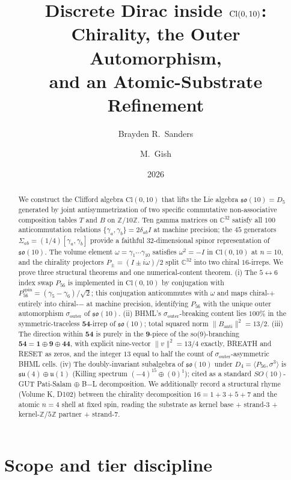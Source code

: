 \documentclass[11pt,reqno]{amsart}
\title[Discrete Dirac inside $\Cl(0, 10)$]
  {Discrete Dirac inside $\Cl(0, 10)$:\\
   Chirality, the Outer Automorphism,\\
   and an Atomic-Substrate Refinement}
\author{Brayden R.\ Sanders}
\author{M.\ Gish}
\date{2026}
\theoremstyle{definition}
\newcommand{\Z}{\mathbb{Z}}
\newcommand{\C}{\mathbb{C}}
\newcommand{\so}{\mathfrak{so}}
\newcommand{\su}{\mathfrak{su}}
\newcommand{\uone}{\mathfrak{u}}
\newcommand{\Cl}{\mathrm{Cl}}
\newcommand{\TSML}{T}
\newcommand{\BHML}{B}
\newcommand{\Psix}{P_{56}}
\newcommand{\Psixspin}{P_{56}^{\mathrm{spin}}}
\newcommand{\sout}{\sigma_{\mathrm{outer}}}
\begin{document}
\begin{abstract}
We construct the Clifford algebra $\Cl(0, 10)$ that lifts the
Lie algebra $\so(10) = D_5$ generated by joint antisymmetrization
of two specific commutative non-associative composition tables
$\TSML$ and $\BHML$ on $\Z/10\Z$. Ten gamma matrices on $\C^{32}$
satisfy all $100$ anticommutation relations $\{\gamma_a, \gamma_b\}
= 2\delta_{ab} I$ at machine precision; the $45$ generators
$\Sigma_{ab} = (1/4)[\gamma_a, \gamma_b]$ provide a faithful
$32$-dimensional spinor representation of $\so(10)$. The volume
element $\omega = \gamma_1 \cdots \gamma_{10}$ satisfies $\omega^2
= -I$ in $\Cl(0, 10)$ at $n=10$, and the chirality projectors
$P_\pm = (I \pm i\omega)/2$ split $\C^{32}$ into two chiral
$16$-irreps. We prove three structural theorems and one
numerical-content theorem. (i) The $5\!\leftrightarrow\!6$ index
swap $\Psix$ is implemented in $\Cl(0, 10)$ by conjugation with
$\Psixspin = (\gamma_5 - \gamma_6)/\sqrt{2}$; this conjugation
anticommutes with $\omega$ and maps chiral-$+$ entirely into
chiral-$-$ at machine precision, identifying $\Psix$ with the
unique outer automorphism $\sout$ of $\so(10)$. (ii) BHML's
$\sout$-breaking content lies $100\%$ in the symmetric-traceless
$\mathbf{54}$-irrep of $\so(10)$; total squared norm $\|B_{\mathrm{anti}}\|^2
= 13/2$. (iii) The direction within $\mathbf{54}$ is purely in the
$\mathbf{9}$-piece of the so(9)-branching $\mathbf{54} = \mathbf{1}
\oplus \mathbf{9} \oplus \mathbf{44}$, with explicit nine-vector
$\|v\|^2 = 13/4$ exactly, BREATH and RESET as zeros, and the integer
$13$ equal to half the count of $\sout$-asymmetric BHML cells.
(iv) The doubly-invariant subalgebra of $\so(10)$ under $D_4 =
\langle \Psix, \sigma^3 \rangle$ is $\su(4) \oplus \uone(1)$
(Killing spectrum $(-4)^{15} \oplus (0)^1$); cited as a standard
$SO(10)$-GUT Pati-Salam $\oplus$ B$-$L decomposition. We additionally
record a structural rhyme (Volume K, D102) between the chirality
decomposition $16 = 1+3+5+7$ and the atomic $n=4$ shell at fixed
spin, reading the substrate as kernel base + strand-$3$ +
kernel-$\Z/5\Z$ partner + strand-$7$.
\end{abstract}

\maketitle

\section*{Scope and tier discipline}
\end{document}
